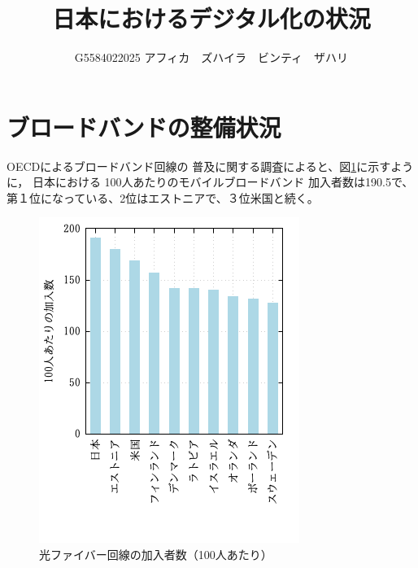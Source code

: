 \documentclass[a4paper,11pt,dvipdfmx]{ujarticle}
\title{日本におけるデジタル化の状況}
\author{G5584022025 アフィカ　ズハイラ　ビンティ　ザハリ}
\begin{document}
\maketitle %

\section{ブロードバンドの整備状況}

OECDによるブロードバンド回線の
普及に関する調査\cite{oecd}によると、図\ref{fiber}に示すように，
日本における 100人あたりのモバイルブロードバンド
加入者数は190.5で、第１位になっている、2位はエストニアで、３位米国と続く。

\begin{figure}[htbp]
    \centering
    \includegraphics{fig21.png}
    \caption{光ファイバー回線の加入者数（100人あたり）}
    \label{fiber}
\end{figure}
\end{document}

